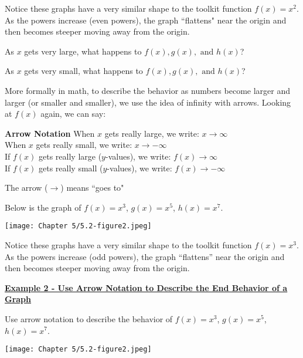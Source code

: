\documentclass[12pt]{book}
\begin{document}
Notice these graphs have a very similar shape to the toolkit function $f(x)=x^2$. As the powers increase (even powers), the graph ``flattens" near the origin and then becomes steeper moving away from the origin.

\bigskip

As $x$ gets very large, what happens to $f(x), g(x), \text{ and}$ $h(x)$?
\vspace{30mm}

As $x$ gets very small, what happens to $f(x), g(x), \text{ and}$ $h(x)$?
\vspace{30mm}


\newpage

More formally in math, to describe the behavior as numbers become larger and larger (or smaller and smaller), we use the idea of infinity with arrows. Looking at $f(x)$ again, we can say: 

\vspace{40mm}

\begin{boxR}
\textbf{Arrow Notation}
\vspace{1mm}
\hline
\vspace{2mm}
     When $x$ gets really large, we write:  $x \to \infty$ \\
     When $x$ gets really small, we write:  $x \to -\infty$ \\
     If $f(x)$ gets really large ($y$-values), we write: $f(x) \to \infty$ \\
    If $f(x)$ gets really small ($y$-values), we write: $f(x) \to -\infty$
    \bigskip
    
    The arrow ($\to$) means ``goes to"
\end{boxR}

Below is the graph of $f(x)=x^3$, $g(x)=x^5$, $h(x)=x^7$.
\bigskip 

\centerline{\texttt{[image: Chapter 5/5.2-figure2.jpeg]}}


Notice these graphs have a very similar shape to the toolkit function $f(x)=x^3$. As the powers increase (odd powers), the graph “flattens” near the origin and then becomes steeper moving away from the origin.


\newpage

\underline{\textbf{Example 2 - Use Arrow Notation to Describe the End Behavior of a Graph}}

Use arrow notation to describe the behavior of $f(x)=x^3$, $g(x)=x^5$, $h(x)=x^7$.

\texttt{[image: Chapter 5/5.2-figure2.jpeg]}
\end{document}
